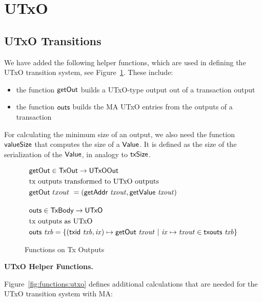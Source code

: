 \section{UTxO}
\label{sec:utxo}


\subsection{UTxO Transitions}
\label{sec:utxo-trans}

We have added the following helper functions, which are used in defining the
UTxO transition system, see Figure~\ref{fig:functions:insouts}. These include:

\begin{itemize}
  \item the function $\mathsf{getOut}$ builds a UTxO-type output out of a
  transaction output
  \item the function $\mathsf{outs}$ builds the MA UTxO entries from the outputs
  of a transaction
\end{itemize}

For calculating the minimum size of an output, we also need the
function $\mathsf{valueSize}$ that computes the size of a $\mathsf{Value}$. It is
defined as the size of the serialization of the $\mathsf{Value}$, in analogy
to $\mathsf{txSize}$.

\begin{figure}[htb]
  \begin{align*}
    & \fun{getOut} \in \TxOut \to \UTxOOut \\
    & \text{tx outputs transformed to UTxO outputs} \\
    & \fun{getOut} ~{txout}~= (\fun{getAddr}~\var{txout}, \fun{getValue}~\var{txout})
    \nextdef
    & \fun{outs} \in \TxBody \to \UTxO \\
    & \text{tx outputs as UTxO} \\
    & \fun{outs} ~\var{txb} =
        \left\{
          (\fun{txid} ~ \var{txb}, \var{ix}) \mapsto \fun{getOut}~\var{txout} ~
          \middle|~
          \var{ix} \mapsto \var{txout} \in \txouts{txb}
        \right\} \\
  \end{align*}
  \caption{Functions on Tx Outputs}
  \label{fig:functions:insouts}
\end{figure}

\textbf{UTxO Helper Functions.}

Figure~\ref{fig:functions:utxo} defines additional calculations that are needed for the
UTxO transition system with MA:

